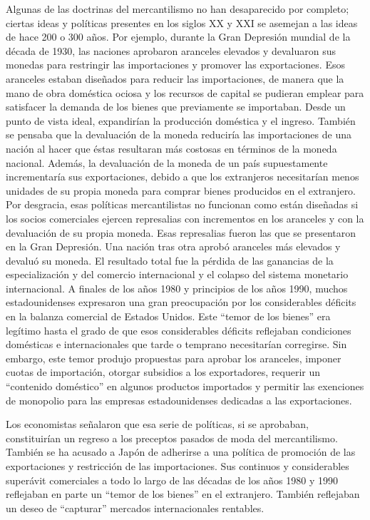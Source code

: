 \documentclass[
  stu,
  floatsintext,
  longtable,
  a4paper,
  nolmodern,
  notxfonts,
  notimes,
  12pt,
  colorlinks=true,linkcolor=blue,citecolor=blue,urlcolor=blue]{apa7}
\begin{document}
Algunas de las doctrinas del mercantilismo no han desaparecido por
completo; ciertas ideas y políticas presentes en los siglos XX y XXI se
asemejan a las ideas de hace 200 o 300 años. Por ejemplo, durante la
Gran Depresión mundial de la década de 1930, las naciones aprobaron
aranceles elevados y devaluaron sus monedas para restringir las
importaciones y promover las exportaciones. Esos aranceles estaban
diseñados para reducir las importaciones, de manera que la mano de obra
doméstica ociosa y los recursos de capital se pudieran emplear para
satisfacer la demanda de los bienes que previamente se importaban. Desde
un punto de vista ideal, expandirían la producción doméstica y el
ingreso. También se pensaba que la devaluación de la moneda reduciría
las importaciones de una nación al hacer que éstas resultaran más
costosas en términos de la moneda nacional. Además, la devaluación de la
moneda de un país supuestamente incrementaría sus exportaciones, debido
a que los extranjeros necesitarían menos unidades de su propia moneda
para comprar bienes producidos en el extranjero. Por desgracia, esas
políticas mercantilistas no funcionan como están diseñadas si los socios
comerciales ejercen represalias con incrementos en los aranceles y con
la devaluación de su propia moneda. Esas represalias fueron las que se
presentaron en la Gran Depresión. Una nación tras otra aprobó aranceles
más elevados y devaluó su moneda. El resultado total fue la pérdida de
las ganancias de la especialización y del comercio internacional y el
colapso del sistema monetario internacional. A finales de los años 1980
y principios de los años 1990, muchos estadounidenses expresaron una
gran preocupación por los considerables déficits en la balanza comercial
de Estados Unidos. Este ``temor de los bienes'' era legítimo hasta el
grado de que esos considerables déficits reflejaban condiciones
domésticas e internacionales que tarde o temprano necesitarían
corregirse. Sin embargo, este temor produjo propuestas para aprobar los
aranceles, imponer cuotas de importación, otorgar subsidios a los
exportadores, requerir un ``contenido doméstico'' en algunos productos
importados y permitir las exenciones de monopolio para las empresas
estadounidenses dedicadas a las exportaciones.

Los economistas señalaron que esa serie de políticas, si se aprobaban,
constituirían un regreso a los preceptos pasados de moda del
mercantilismo. También se ha acusado a Japón de adherirse a una política
de promoción de las exportaciones y restricción de las importaciones.
Sus continuos y considerables superávit comerciales a todo lo largo de
las décadas de los años 1980 y 1990 reflejaban en parte un ``temor de
los bienes'' en el extranjero. También reflejaban un deseo de
``capturar'' mercados internacionales rentables.
\end{document}
